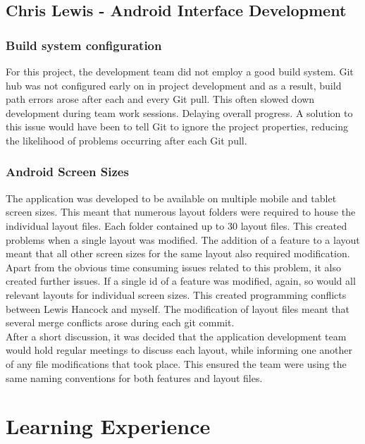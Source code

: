 \documentclass[11pt,a4paper]{report}
\begin{document}
\subsection{Chris Lewis - Android Interface Development}

\subsubsection{Build system configuration}

For this project, the development team did not employ a good build system. Git hub was not configured early on in project development and as a result, build path errors arose after each and every Git pull. This often slowed down development during team work sessions. Delaying overall progress. A solution to this issue would have been to tell Git to ignore the project properties, reducing the likelihood of problems occurring after each Git pull.

\subsubsection{Android Screen Sizes}

The application was developed to be available on multiple mobile and tablet screen sizes. This meant that numerous layout folders were required to house the individual layout files. Each folder contained up to 30 layout files. This created problems when a single layout was modified. The addition of a feature to a layout meant that all other screen sizes for the same layout also required modification. Apart from the obvious time consuming issues related to this problem, it also created further issues. If a single id of a feature was modified, again, so would all relevant layouts for individual screen sizes. This created programming conflicts between Lewis Hancock and myself. The modification of layout files meant that several merge conflicts arose during each git commit.\\

After a short discussion, it was decided that the application development team would hold regular meetings to discuss each layout, while informing one another of any file modifications that took place. This ensured the team were using the same naming conventions for both features and layout files.

\section{Learning Experience}
\label{sec:learning-experience}
\end{document}
